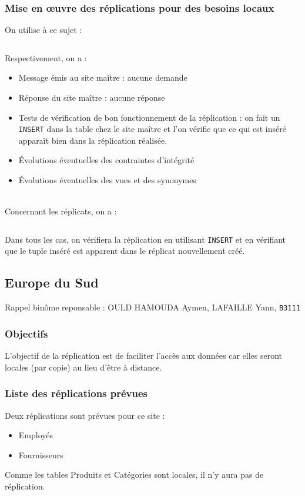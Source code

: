 \documentclass[10pt,a4paper]{article}
\theoremstyle{plain}
\begin{document}
\subsubsection{Mise en \oe uvre des réplications pour des besoins locaux}
On utilise à ce sujet :
\inputminted{sql}{INSA-DB12-EuropeNord-replication.sql}
Respectivement, on a :
\begin{itemize}
    \item Message émis au site maître : aucune demande
    \item Réponse du site maître : aucune réponse
    \item Tests de vérification de bon fonctionnement de la réplication : on fait un \verb|INSERT| dans la table chez le site maître et l'on vérifie que ce qui est inséré apparaît bien dans la réplication réalisée.
    \item Évolutions éventuelles des contraintes d'intégrité
    \item Évolutions éventuelles des vues et des synonymes
\end{itemize}
~\\
Concernant les réplicats, on a :
\inputminted{sql}{INSA-DB12-EuropeNord-vues-replicats.sql}
Dans tous les cas, on vérifiera la réplication en utilisant \verb|INSERT| et en vérifiant que le tuple inséré est apparent dans le réplicat nouvellement créé.

\newpage

\subsection{Europe du Sud}
Rappel binôme reponsable : OULD HAMOUDA Aymen, LAFAILLE Yann, \verb|B3111|

\subsubsection{Objectifs}
L’objectif de la réplication est de faciliter l’accès aux données car elles seront locales (par copie) au lieu d'être à distance.


\subsubsection{Liste des réplications prévues}
Deux réplications sont prévues pour ce site :
\begin{itemize}
    \item Employés
    \item Fournisseurs
\end{itemize}
Comme les tables Produits et Catégories sont locales, il n'y aura pas de réplication.
\end{document}
